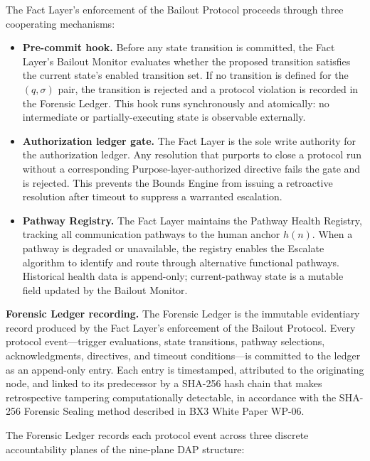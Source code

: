 The Fact Layer's enforcement of the Bailout Protocol proceeds through three cooperating mechanisms:

\begin{itemize}\itemsep=0pt
\item[(\textit{i})] \textbf{Pre-commit hook.} Before any state transition is committed, the Fact Layer's Bailout Monitor evaluates whether the proposed transition satisfies the current state's enabled transition set. If no transition is defined for the $(q, \sigma)$ pair, the transition is rejected and a protocol violation is recorded in the Forensic Ledger. This hook runs synchronously and atomically: no intermediate or partially-executing state is observable externally.

\item[(\textit{ii})] \textbf{Authorization ledger gate.} The Fact Layer is the sole write authority for the authorization ledger. Any resolution that purports to close a protocol run without a corresponding Purpose-layer-authorized directive fails the gate and is rejected. This prevents the Bounds Engine from issuing a retroactive resolution after timeout to suppress a warranted escalation.

\item[(\textit{iii})] \textbf{Pathway Registry.} The Fact Layer maintains the Pathway Health Registry, tracking all communication pathways to the human anchor $h(n)$. When a pathway is degraded or unavailable, the registry enables the Escalate algorithm to identify and route through alternative functional pathways. Historical health data is append-only; current-pathway state is a mutable field updated by the Bailout Monitor.
\end{itemize}

\bigskip
\noindent\textbf{Forensic Ledger recording.} The Forensic Ledger is the immutable evidentiary record produced by the Fact Layer's enforcement of the Bailout Protocol. Every protocol event---trigger evaluations, state transitions, pathway selections, acknowledgments, directives, and timeout conditions---is committed to the ledger as an append-only entry. Each entry is timestamped, attributed to the originating node, and linked to its predecessor by a SHA-256 hash chain that makes retrospective tampering computationally detectable, in accordance with the SHA-256 Forensic Sealing method described in BX3 White Paper WP-06.

The Forensic Ledger records each protocol event across three discrete accountability planes of the nine-plane DAP structure:

